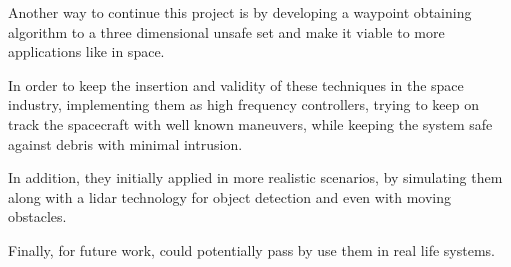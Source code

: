 Another way to continue this project is by developing a waypoint obtaining algorithm to a three dimensional unsafe set and make it viable to more applications like in space. 

In order to keep the insertion and validity of these techniques in the space industry, implementing them as high frequency controllers, trying to keep on track the spacecraft with well known maneuvers, while keeping the system safe against debris with minimal intrusion.  

In addition, they initially applied in more realistic scenarios, by simulating them along with a lidar technology for object detection and even with moving obstacles.

Finally, for future work, could potentially pass by use them in real life systems. 